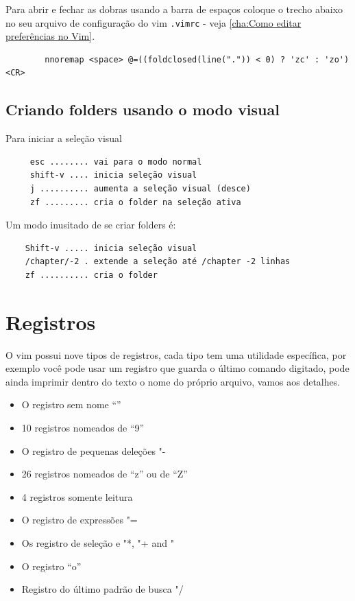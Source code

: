 \documentclass[10pt,a4paper,openany]{book}
\begin{document}
Para abrir e fechar as dobras usando a barra de
espaços coloque o trecho abaixo no seu arquivo de configuração do vim
\verb|.vimrc| - veja \ref{cha:Como editar preferências no Vim}.

\begin{verbatim}
		nnoremap <space> @=((foldclosed(line(".")) < 0) ? 'zc' : 'zo')<CR>
\end{verbatim}

\section{Criando folders usando o modo visual}
\label{Criando folders usando o modo visual}
Para iniciar a seleção visual

\begin{verbatim}
	 esc ........ vai para o modo normal
	 shift-v .... inicia seleção visual
	 j .......... aumenta a seleção visual (desce)
	 zf ......... cria o folder na seleção ativa
\end{verbatim}

Um modo inusitado de se criar folders é:

\begin{verbatim}
	Shift-v ..... inicia seleção visual
	/chapter/-2 . extende a seleção até /chapter -2 linhas
	zf .......... cria o folder
\end{verbatim}

\chapter{Registros}
\label{Registros}

O vim possui nove tipos de registros, cada tipo tem uma utilidade
específica, por exemplo você pode usar um registro que guarda o último
comando digitado, pode ainda imprimir dentro do texto o nome do
próprio arquivo, vamos aos detalhes.

\begin{itemize}
	\item O registro sem nome ``''
	\item 10 registros nomeados de ``9''
	\item O registro de pequenas deleções "-
	\item 26 registros nomeados de ``z'' ou de ``Z''
	\item 4 registros somente leitura
	\item O registro de expressões "=
	\item Os registro de seleção e  "*, "+ and "~
	\item O registro ``o''
	\item Registro do último padrão de busca "/
\end{itemize}
\end{document}
